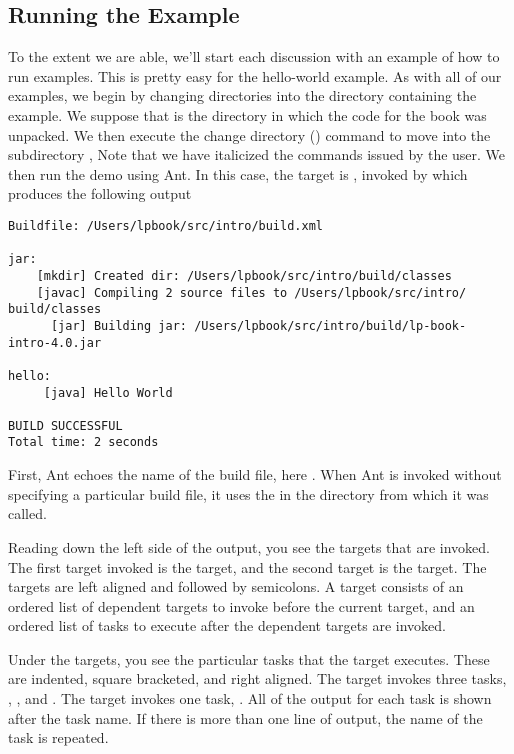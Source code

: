 \subsection{Running the Example}

To the extent we are able, we'll start each discussion with an example
of how to run examples.  This is pretty easy for the hello-world
example.  As with all of our examples, we begin by changing
directories into the directory containing the example.  We suppose
that \relpath{} is the directory in which the code for the book was unpacked.
We then execute the change directory () command to move
into the subdirectory ,
%
%
Note that we have italicized the commands issued by the user.
%
We then run the demo using Ant.  In this case, the target is ,
invoked by
%
%
which produces the following output
%
\begin{verbatim}
Buildfile: /Users/lpbook/src/intro/build.xml

jar:
    [mkdir] Created dir: /Users/lpbook/src/intro/build/classes
    [javac] Compiling 2 source files to /Users/lpbook/src/intro/
build/classes
      [jar] Building jar: /Users/lpbook/src/intro/build/lp-book-
intro-4.0.jar

hello:
     [java] Hello World

BUILD SUCCESSFUL
Total time: 2 seconds
\end{verbatim}
%
First, Ant echoes the name of the build file, here
.  When Ant is
invoked without specifying a particular build file, it uses the
 in the directory from which it was called.  

Reading down the left side of the output, you see the targets that are
invoked.  The first target invoked is the  target, and the
second target is the  target.  The targets are left aligned
and followed by semicolons.  A target consists of an ordered list of
dependent targets to invoke before the current target, and an ordered
list of tasks to execute after the dependent targets are invoked.

Under the targets, you see the particular tasks that the target
executes.  These are indented, square bracketed, and right aligned.
The  target invokes three tasks, , ,
and .  The  target invokes one task, .
All of the output for each task is shown after the task name.  If
there is more than one line of output, the name of the task is
repeated.

